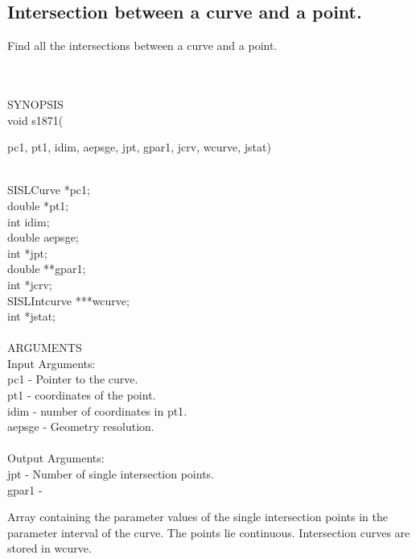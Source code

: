 \subsection{Intersection between a curve and a point.}
\begin{minipg1}
  Find all the intersections between a curve and a point.
\end{minipg1}\\ \\
SYNOPSIS\\
        \>void s1871(\begin{minipg3}
        {\fov pc1}, {\fov pt1}, {\fov idim}, {\fov aepsge}, {\fov jpt}, {\fov gpar1}, {\fov jcrv},
        {\fov wcurve}, {\fov jstat})
                \end{minipg3}\\[0.3ex]
                \>\>    SISLCurve \>  *{\fov pc1};\\
                \>\>    double    \>  *{\fov pt1};\\
                \>\>    int       \>  {\fov idim};\\
                \>\>    double    \>  {\fov aepsge};\\
                \>\>    int       \>  *{\fov jpt};\\
                \>\>    double    \>  **{\fov gpar1};\\
                \>\>    int       \>  *{\fov jcrv};\\
                \>\>    SISLIntcurve \> ***{\fov wcurve};\\
                \>\>    int       \>  *{\fov jstat};\\
\\
ARGUMENTS\\
        \>Input Arguments:\\
        \>\>    {\fov pc1}    \> - \> Pointer to the curve.\\
        \>\>    {\fov pt1}    \> - \> coordinates of the point.\\
        \>\>    {\fov idim}   \> - \> number of coordinates in {\fov pt1}.\\
        \>\>    {\fov aepsge} \> - \> Geometry resolution.\\
\\
        \>Output Arguments:\\
        \>\>    {\fov jpt}    \> - \> Number of single intersection points.\\
        \>\>    {\fov gpar1}  \> - \> \begin{minipg2}
                                        Array containing the parameter
                                        values of the single
                                        intersection points in the
                                        parameter interval of the
                                        curve. The points lie
                                        continuous. Intersection curves
                                        are stored in {\fov wcurve}.
                                      \end{minipg2}\\[0.8ex]
